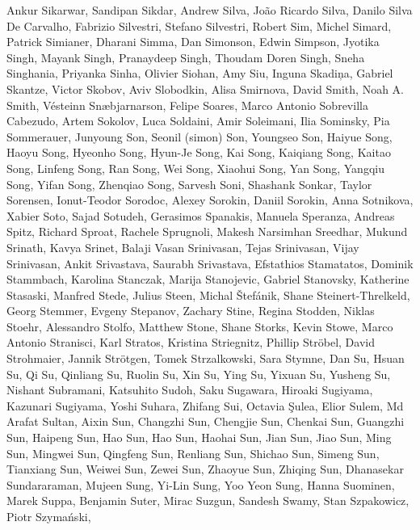 Ankur Sikarwar, Sandipan Sikdar, Andrew Silva, João Ricardo Silva, Danilo Silva De Carvalho, Fabrizio Silvestri, Stefano Silvestri, Robert Sim, Michel Simard, Patrick Simianer, Dharani Simma, Dan Simonson, Edwin Simpson, Jyotika Singh, Mayank Singh, Pranaydeep Singh, Thoudam Doren Singh, Sneha Singhania, Priyanka Sinha, Olivier Siohan, Amy Siu, Inguna Skadiņa, Gabriel Skantze, Victor Skobov, Aviv Slobodkin, Alisa Smirnova, David Smith, Noah A. Smith, Vésteinn Snæbjarnarson, Felipe Soares, Marco Antonio Sobrevilla Cabezudo, Artem Sokolov, Luca Soldaini, Amir Soleimani, Ilia Sominsky, Pia Sommerauer, Junyoung Son, Seonil (simon) Son, Youngseo Son, Haiyue Song, Haoyu Song, Hyeonho Song, Hyun-Je Song, Kai Song, Kaiqiang Song, Kaitao Song, Linfeng Song, Ran Song, Wei Song, Xiaohui Song, Yan Song, Yangqiu Song, Yifan Song, Zhenqiao Song, Sarvesh Soni, Shashank Sonkar, Taylor Sorensen, Ionut-Teodor Sorodoc, Alexey Sorokin, Daniil Sorokin, Anna Sotnikova, Xabier Soto, Sajad Sotudeh, Gerasimos Spanakis, Manuela Speranza, Andreas Spitz, Richard Sproat, Rachele Sprugnoli, Makesh Narsimhan Sreedhar, Mukund Srinath, Kavya Srinet, Balaji Vasan Srinivasan, Tejas Srinivasan, Vijay Srinivasan, Ankit Srivastava, Saurabh Srivastava, Efstathios Stamatatos, Dominik Stammbach, Karolina Stanczak, Marija Stanojevic, Gabriel Stanovsky, Katherine Stasaski, Manfred Stede, Julius Steen, Michal Štefánik, Shane Steinert-Threlkeld, Georg Stemmer, Evgeny Stepanov, Zachary Stine, Regina Stodden, Niklas Stoehr, Alessandro Stolfo, Matthew Stone, Shane Storks, Kevin Stowe, Marco Antonio Stranisci, Karl Stratos, Kristina Striegnitz, Phillip Ströbel, David Strohmaier, Jannik Strötgen, Tomek Strzalkowski, Sara Stymne, Dan Su, Hsuan Su, Qi Su, Qinliang Su, Ruolin Su, Xin Su, Ying Su, Yixuan Su, Yusheng Su, Nishant Subramani, Katsuhito Sudoh, Saku Sugawara, Hiroaki Sugiyama, Kazunari Sugiyama, Yoshi Suhara, Zhifang Sui, Octavia Şulea, Elior Sulem, Md Arafat Sultan, Aixin Sun, Changzhi Sun, Chengjie Sun, Chenkai Sun, Guangzhi Sun, Haipeng Sun, Hao Sun, Hao Sun, Haohai Sun, Jian Sun, Jiao Sun, Ming Sun, Mingwei Sun, Qingfeng Sun, Renliang Sun, Shichao Sun, Simeng Sun, Tianxiang Sun, Weiwei Sun, Zewei Sun, Zhaoyue Sun, Zhiqing Sun, Dhanasekar Sundararaman, Mujeen Sung, Yi-Lin Sung, Yoo Yeon Sung, Hanna Suominen, Marek Suppa, Benjamin Suter, Mirac Suzgun, Sandesh Swamy, Stan Szpakowicz, Piotr Szymański,
